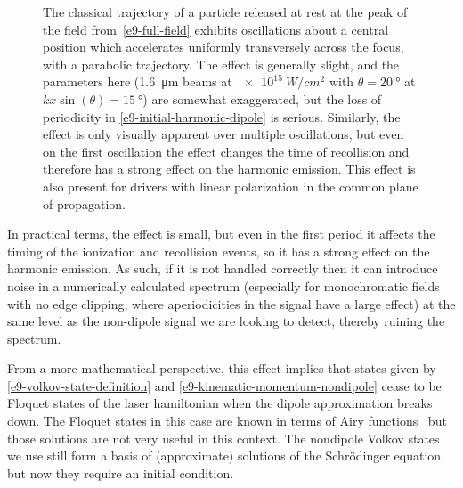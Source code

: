\begin{figure}[htb]
  \captionsetup{width=\textwidth}
  \caption[
  Classical trajectory of a particle released at the peak of the field in two noncollinear bicircular fields, showing transverse acceleration across the focus
  ]{
  The classical trajectory of a particle released at rest at the peak of the field from~\eqref{e9-full-field} exhibits oscillations about a central position which accelerates uniformly transversely across the focus, with a parabolic trajectory. The effect is generally slight, and the parameters here (\SI{1.6}{\micro\meter} beams at $\SI{e15}{W/cm^2}$ with $\theta=\SI{20}{\degree}$ at $kx\sin(\theta)=\SI{15}{\degree}$) are somewhat exaggerated, but the loss of periodicity in \eqref{e9-initial-harmonic-dipole} is serious. Similarly, the effect is only visually apparent over multiple oscillations, but even on the first oscillation the effect changes the time of recollision and therefore has a strong effect on the harmonic emission. This effect is also present for drivers with linear polarization in the common plane of propagation.
  }
\label{f9-trajectory}
\end{figure}


In practical terms, the effect is small, but even in the first period it affects the timing of the ionization and recollision events, so it has a strong effect on the harmonic emission. As such, if it is not handled correctly then it can introduce noise in a numerically calculated spectrum (especially for monochromatic fields with no edge clipping, where aperiodicities in the signal have a large effect) at the same level as the non-dipole signal we are looking to detect, thereby ruining the spectrum.




From a more mathematical perspective, this effect implies that states given by \eqref{e9-volkov-state-definition} and \eqref{e9-kinematic-momentum-nondipole} cease to be Floquet states of the laser hamiltonian when the dipole approximation breaks down. The Floquet states in this case are known in terms of Airy functions~\cite{Li-Reichl-Floquet} but those solutions are not very useful in this context. The nondipole Volkov states we use still form a basis of (approximate) solutions of the Schrödinger equation, but now they require an initial condition.




